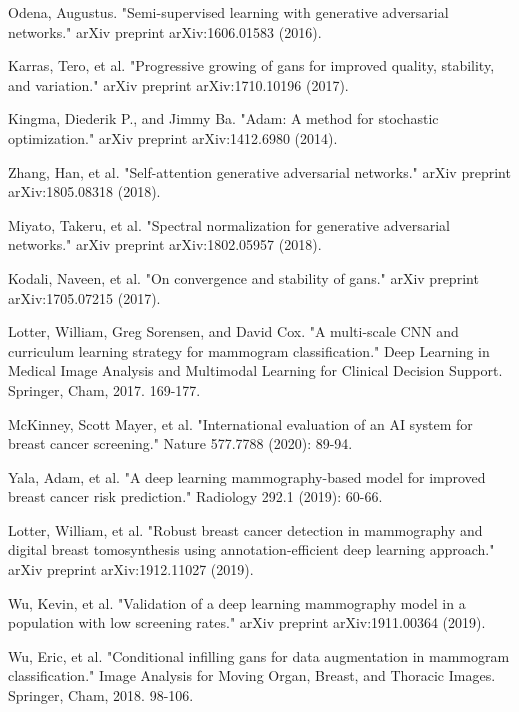 \documentclass{article}
\begin{document}
%
%

\begin{thebibliography}{}

Odena, Augustus. "Semi-supervised learning with generative adversarial networks." arXiv preprint arXiv:1606.01583 (2016).

Karras, Tero, et al. "Progressive growing of gans for improved quality, stability, and variation." arXiv preprint arXiv:1710.10196 (2017).

Kingma, Diederik P., and Jimmy Ba. "Adam: A method for stochastic optimization." arXiv preprint arXiv:1412.6980 (2014).

Zhang, Han, et al. "Self-attention generative adversarial networks." arXiv preprint arXiv:1805.08318 (2018).

Miyato, Takeru, et al. "Spectral normalization for generative adversarial networks." arXiv preprint arXiv:1802.05957 (2018).

Kodali, Naveen, et al. "On convergence and stability of gans." arXiv preprint arXiv:1705.07215 (2017).

Lotter, William, Greg Sorensen, and David Cox. "A multi-scale CNN and curriculum learning strategy for mammogram classification." Deep Learning in Medical Image Analysis and Multimodal Learning for Clinical Decision Support. Springer, Cham, 2017. 169-177.

McKinney, Scott Mayer, et al. "International evaluation of an AI system for breast cancer screening." Nature 577.7788 (2020): 89-94.

Yala, Adam, et al. "A deep learning mammography-based model for improved breast cancer risk prediction." Radiology 292.1 (2019): 60-66.

Lotter, William, et al. "Robust breast cancer detection in mammography and digital breast tomosynthesis using annotation-efficient deep learning approach." arXiv preprint arXiv:1912.11027 (2019).

Wu, Kevin, et al. "Validation of a deep learning mammography model in a population with low screening rates." arXiv preprint arXiv:1911.00364 (2019).

Wu, Eric, et al. "Conditional infilling gans for data augmentation in mammogram classification." Image Analysis for Moving Organ, Breast, and Thoracic Images. Springer, Cham, 2018. 98-106.


\end{thebibliography}
\end{document}
